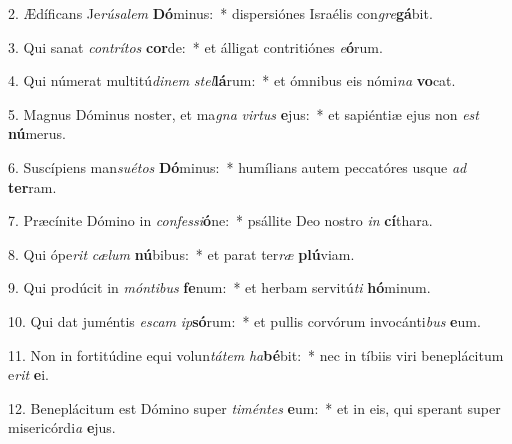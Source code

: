 2. Ædíficans Je\textit{rú}\textit{sa}\textit{lem} \textbf{Dó}minus:~*  dispersiónes Israélis con\textit{gre}\textbf{gá}bit.\

3. Qui sanat \textit{con}\textit{trí}\textit{tos} \textbf{cor}de:~*  et álligat contritiónes \textit{e}\textbf{ó}rum.\

4. Qui númerat multitú\textit{di}\textit{nem} \textit{stel}\textbf{lá}rum:~*  et ómnibus eis nómi\textit{na} \textbf{vo}cat.\

5. Magnus Dóminus noster, et ma\textit{gna} \textit{vir}\textit{tus} \textbf{e}jus:~*  et sapiéntiæ ejus non \textit{est} \textbf{nú}merus.\

6. Suscípiens man\textit{su}\textit{é}\textit{tos} \textbf{Dó}minus:~*  humílians autem peccatóres usque \textit{ad} \textbf{ter}ram.\

7. Præcínite Dómino in \textit{con}\textit{fes}\textit{si}\textbf{ó}ne:~*  psállite Deo nostro \textit{in} \textbf{cí}thara.\

8. Qui ópe\textit{rit} \textit{cæ}\textit{lum} \textbf{nú}bibus:~*  et parat ter\textit{ræ} \textbf{plú}viam.\

9. Qui prodúcit in \textit{món}\textit{ti}\textit{bus} \textbf{fe}num:~*  et herbam servitú\textit{ti} \textbf{hó}minum.\

10. Qui dat juméntis \textit{es}\textit{cam} \textit{ip}\textbf{só}rum:~*  et pullis corvórum invocánti\textit{bus} \textbf{e}um.\

11. Non in fortitúdine equi volun\textit{tá}\textit{tem} \textit{ha}\textbf{bé}bit:~*  nec in tíbiis viri beneplácitum e\textit{rit} \textbf{e}i.\

12. Beneplácitum est Dómino super \textit{ti}\textit{mén}\textit{tes} \textbf{e}um:~*  et in eis, qui sperant super misericórdi\textit{a} \textbf{e}jus.\

